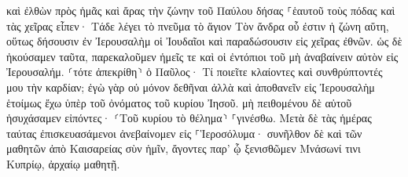 \documentclass{openreader}
\begin{document}
καὶ ἐλθὼν πρὸς ἡμᾶς καὶ ἄρας τὴν ζώνην τοῦ Παύλου δήσας ⸀ἑαυτοῦ τοὺς πόδας καὶ τὰς χεῖρας εἶπεν· Τάδε λέγει τὸ πνεῦμα τὸ ἅγιον Τὸν ἄνδρα οὗ ἐστιν ἡ ζώνη αὕτη, οὕτως δήσουσιν ἐν Ἰερουσαλὴμ οἱ Ἰουδαῖοι καὶ παραδώσουσιν εἰς χεῖρας ἐθνῶν. 
ὡς δὲ ἠκούσαμεν ταῦτα, παρεκαλοῦμεν ἡμεῖς τε καὶ οἱ ἐντόπιοι τοῦ μὴ ἀναβαίνειν αὐτὸν εἰς Ἰερουσαλήμ. 
⸂τότε ἀπεκρίθη⸃ ὁ Παῦλος· Τί ποιεῖτε κλαίοντες καὶ συνθρύπτοντές μου τὴν καρδίαν; ἐγὼ γὰρ οὐ μόνον δεθῆναι ἀλλὰ καὶ ἀποθανεῖν εἰς Ἰερουσαλὴμ ἑτοίμως ἔχω ὑπὲρ τοῦ ὀνόματος τοῦ κυρίου Ἰησοῦ. 
μὴ πειθομένου δὲ αὐτοῦ ἡσυχάσαμεν εἰπόντες· ⸂Τοῦ κυρίου τὸ θέλημα⸃ ⸀γινέσθω. 
Μετὰ δὲ τὰς ἡμέρας ταύτας ἐπισκευασάμενοι ἀνεβαίνομεν εἰς ⸀Ἱεροσόλυμα· 
συνῆλθον δὲ καὶ τῶν μαθητῶν ἀπὸ Καισαρείας σὺν ἡμῖν, ἄγοντες παρ’ ᾧ ξενισθῶμεν Μνάσωνί τινι Κυπρίῳ, ἀρχαίῳ μαθητῇ. 
\end{document}
